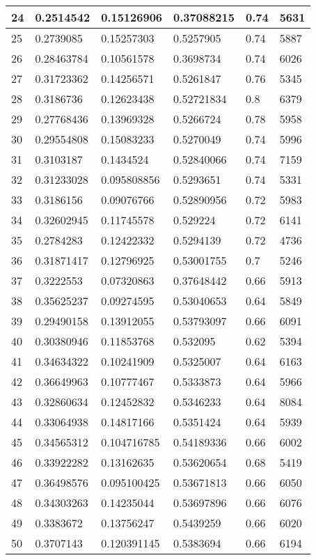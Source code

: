\begin{longtable}{|l|l|l|l|l|l|}
24 & 0.2514542 & 0.15126906 & 0.37088215 & 0.74 & 5631 \\ \hline 
25 & 0.2739085 & 0.15257303 & 0.5257905 & 0.74 & 5887 \\ \hline 
26 & 0.28463784 & 0.10561578 & 0.3698734 & 0.74 & 6026 \\ \hline 
27 & 0.31723362 & 0.14256571 & 0.5261847 & 0.76 & 5345 \\ \hline 
28 & 0.3186736 & 0.12623438 & 0.52721834 & 0.8 & 6379 \\ \hline 
29 & 0.27768436 & 0.13969328 & 0.5266724 & 0.78 & 5958 \\ \hline 
30 & 0.29554808 & 0.15083233 & 0.5270049 & 0.74 & 5996 \\ \hline 
31 & 0.3103187 & 0.1434524 & 0.52840066 & 0.74 & 7159 \\ \hline 
32 & 0.31233028 & 0.095808856 & 0.5293651 & 0.74 & 5331 \\ \hline 
33 & 0.3186156 & 0.09076766 & 0.52890956 & 0.72 & 5983 \\ \hline 
34 & 0.32602945 & 0.11745578 & 0.529224 & 0.72 & 6141 \\ \hline 
35 & 0.2784283 & 0.12422332 & 0.5294139 & 0.72 & 4736 \\ \hline 
36 & 0.31871417 & 0.12796925 & 0.53001755 & 0.7 & 5246 \\ \hline 
37 & 0.3222553 & 0.07320863 & 0.37648442 & 0.66 & 5913 \\ \hline 
38 & 0.35625237 & 0.09274595 & 0.53040653 & 0.64 & 5849 \\ \hline 
39 & 0.29490158 & 0.13912055 & 0.53793097 & 0.66 & 6091 \\ \hline 
40 & 0.30380946 & 0.11853768 & 0.532095 & 0.62 & 5394 \\ \hline 
41 & 0.34634322 & 0.10241909 & 0.5325007 & 0.64 & 6163 \\ \hline 
42 & 0.36649963 & 0.10777467 & 0.5333873 & 0.64 & 5966 \\ \hline 
43 & 0.32860634 & 0.12452832 & 0.5346233 & 0.64 & 8084 \\ \hline 
44 & 0.33064938 & 0.14817166 & 0.5351424 & 0.64 & 5939 \\ \hline 
45 & 0.34565312 & 0.104716785 & 0.54189336 & 0.66 & 6002 \\ \hline 
46 & 0.33922282 & 0.13162635 & 0.53620654 & 0.68 & 5419 \\ \hline 
47 & 0.36498576 & 0.095100425 & 0.53671813 & 0.66 & 6050 \\ \hline 
48 & 0.34303263 & 0.14235044 & 0.53697896 & 0.66 & 6076 \\ \hline 
49 & 0.3383672 & 0.13756247 & 0.5439259 & 0.66 & 6020 \\ \hline 
50 & 0.3707143 & 0.120391145 & 0.5383694 & 0.66 & 6194 \\ \hline 
\end{longtable}